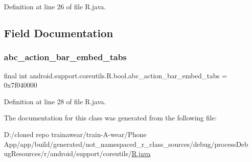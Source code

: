 Definition at line 26 of file R.\+java.


\begin{DoxyCode}{0}

\end{DoxyCode}


\subsection{Field Documentation}
\mbox{\label{classandroid_1_1support_1_1coreutils_1_1_r_1_1bool_a823fbd5acb99b42be3b1595abf7aeadb}} 
\subsubsection{\texorpdfstring{abc\_action\_bar\_embed\_tabs}{abc\_action\_bar\_embed\_tabs}}
{\footnotesize\ttfamily final int android.\+support.\+coreutils.\+R.\+bool.\+abc\+\_\+action\+\_\+bar\+\_\+embed\+\_\+tabs = 0x7f040000\hspace{0.3cm}{\ttfamily [static]}}



Definition at line 28 of file R.\+java.



The documentation for this class was generated from the following file\+:\begin{DoxyCompactItemize}
\item 
D\+:/cloned repo trainawear/train-\/\+A-\/wear/\+Phone App/app/build/generated/not\+\_\+namespaced\+\_\+r\+\_\+class\+\_\+sources/debug/process\+Debug\+Resources/r/android/support/coreutils/\mbox{\hyperlink{process_debug_resources_2r_2android_2support_2coreutils_2_r_8java}{R.\+java}}\end{DoxyCompactItemize}
